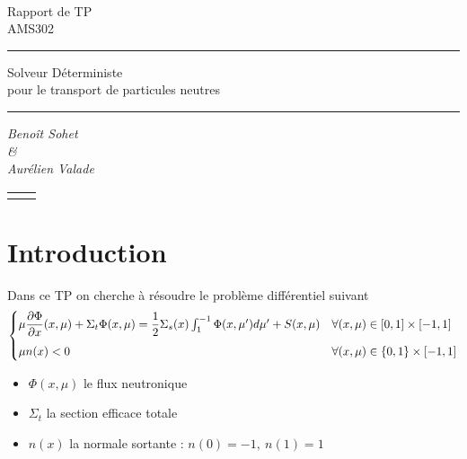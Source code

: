 \documentclass[11pt,a4paper]{article}
\newcommand{\dx}[1]{\dfrac{\partial #1}{\partial x}}
\begin{document}
\begin{titlepage}
  ~\vspace{90pt}
  \centering \bfseries

  \huge Rapport de TP \\AMS302

  \vspace{50pt}
  \rule{0.5\textwidth}{1pt}
  \vspace{50pt}

  \Huge Solveur Déterministe \\ pour le transport de particules neutres

  \vspace{50pt}
  \rule{0.5\textwidth}{1pt}

  \vspace{50pt}
  \huge {\itshape Benoît Sohet \\ \& \\ Aurélien Valade}

  \vfill
  \begin{tabular}{cc}
    \begin{minipage}{.49\textwidth}
      \centering
    \end{minipage}
    &
      \begin{minipage}{.49\textwidth}
        \centering
      \end{minipage}
  \end{tabular}

\end{titlepage}

\newpage

\section{Introduction}

Dans ce TP on cherche à résoudre le problème différentiel suivant 
\begin{equation}
  \label{eq:principal}
  \begin{cases}
    \mu \dx{\Phi}(x, \mu) + \Sigma_t \Phi(x, \mu) =
    \dfrac{1}{2} \Sigma_s(x) \int_1^{-1} \Phi(x, \mu') d\mu' + S(x, \mu) & \forall (x, \mu) \in [0,1]\times[-1,1]  \medskip\\ 
    \mu n(x) < 0  & \forall (x, \mu) \in \{0,1\}\times[-1,1] 
  \end{cases}
\end{equation}

\begin{itemize}
\item $\Phi(x, \mu)$ le flux neutronique
\item $\Sigma_t$ la section efficace totale 
\item $n(x)$ la normale sortante : $n(0) = -1, ~ n(1) = 1$
\end{itemize}
\end{document}
